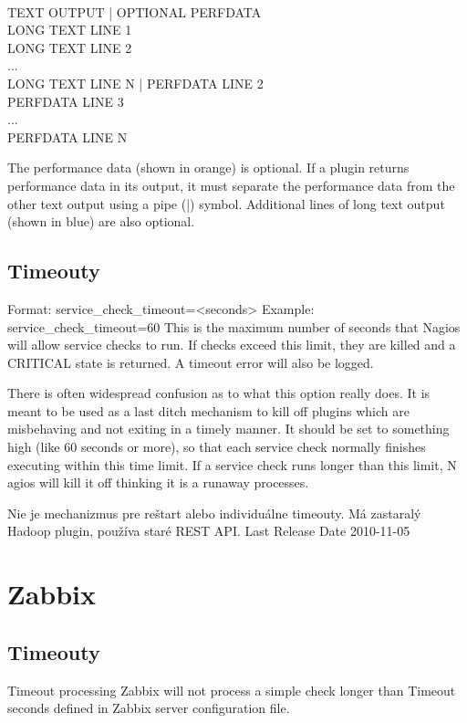 \documentclass[11pt,final,oneside]{fithesis}
\begin{document}
\\TEXT OUTPUT | OPTIONAL PERFDATA
\\LONG TEXT LINE 1
\\LONG TEXT LINE 2
\\...
\\LONG TEXT LINE N | PERFDATA LINE 2
\\PERFDATA LINE 3
\\...
\\PERFDATA LINE N

The performance data (shown in orange) is optional. If a plugin returns performance data in its output, it must separate the performance data from the other text output using a pipe (|) symbol. Additional lines of long text output (shown in blue) are also optional.
\cite{01}

\subsection{Timeouty}

Format:	service\_check\_timeout=<seconds>
Example:	service\_check\_timeout=60
This is the maximum number of seconds that Nagios will allow service checks to run. If checks exceed this limit, they are killed and a CRITICAL state is returned. A timeout error will also be logged.

There is often widespread confusion as to what this option really does. It is meant to be used as a last ditch mechanism to kill off plugins which are misbehaving and not exiting in a timely manner. 
It should be set to something high (like 60 seconds or more), so that each service check normally finishes executing within this time limit. If a service check runs longer than this limit, N
agios will kill it off thinking it is a runaway processes.

\cite{02}


Nie je mechanizmus pre reštart alebo individuálne timeouty.
Má zastaralý Hadoop plugin, používa staré REST API.
Last Release Date 2010-11-05
\cite{03}

\section{Zabbix}
\subsection{Timeouty}
Timeout processing
Zabbix will not process a simple check longer than Timeout seconds defined in Zabbix server configuration file.
\cite{04}
\end{document}
